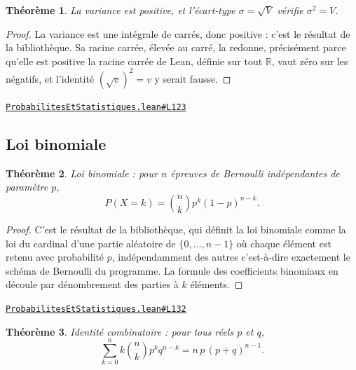 \documentclass[11pt,a4paper]{article}
\theoremstyle{definition}
\theoremstyle{plain}
\newtheorem{theoreme}{Théorème}
\newcommand{\source}[2]{\par\smallskip\noindent\hfill{\footnotesize\href{#1}{\texttt{#2}}}\par\smallskip}
\begin{document}
\begin{theoreme}
La variance est positive, et l'écart-type $\sigma = \sqrt{V}$ vérifie $\sigma^{2} = V$.
\end{theoreme}

\begin{proof}
La variance est une intégrale de carrés, donc positive : c'est le résultat de la
bibliothèque. Sa racine carrée, élevée au carré, la redonne, précisément parce qu'elle est
positive \textemdash{} la racine carrée de Lean, définie sur tout $\mathbb{R}$, vaut zéro
sur les négatifs, et l'identité $(\sqrt{v})^{2} = v$ y serait fausse.
\end{proof}
\source{https://github.com/Commutator-IO/learn-lean/blob/main/cours/02-lycee/09-probabilites-et-statistiques/ProbabilitesEtStatistiques.lean\#L123}{ProbabilitesEtStatistiques.lean\#L123}

\subsection{Loi binomiale}

\begin{theoreme}
Loi binomiale : pour $n$ épreuves de Bernoulli indépendantes de paramètre $p$,
\[ P(X = k) = \binom{n}{k} p^{k} (1-p)^{n-k} . \]
\end{theoreme}

\begin{proof}
C'est le résultat de la bibliothèque, qui définit la loi binomiale comme la loi du cardinal
d'une partie aléatoire de $\{0, \dots, n-1\}$ où chaque élément est retenu avec probabilité
$p$, indépendamment des autres \textemdash{} c'est-à-dire exactement le schéma de Bernoulli
du programme. La formule des coefficients binomiaux en découle par dénombrement des parties
à $k$ éléments.
\end{proof}
\source{https://github.com/Commutator-IO/learn-lean/blob/main/cours/02-lycee/09-probabilites-et-statistiques/ProbabilitesEtStatistiques.lean\#L132}{ProbabilitesEtStatistiques.lean\#L132}

\begin{theoreme}
Identité combinatoire : pour tous réels $p$ et $q$,
\[ \sum_{k=0}^{n} k \binom{n}{k} p^{k} q^{n-k} = n\,p\,(p + q)^{n-1} . \]
\end{theoreme}
\end{document}
